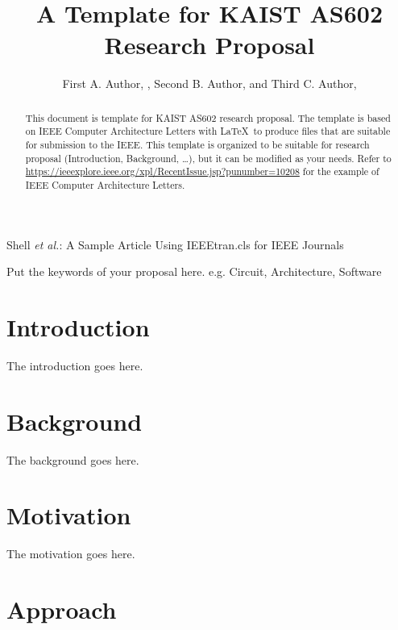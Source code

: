 \documentclass[journal,9pt]{IEEEtran}
\begin{document}
\title{A Template for KAIST AS602 Research Proposal}

\author{First A. Author, , Second B. Author, and Third C. Author, 
}

%
{Shell \MakeLowercase{\textit{et al.}}: A Sample Article Using IEEEtran.cls for IEEE Journals}


\maketitle
\begin{abstract}
  This document is template for KAIST AS602 research proposal.
  The template is based on IEEE Computer Architecture Letters with \LaTeX \ to produce files that are suitable for submission to the IEEE.
  This template is organized to be suitable for research proposal (Introduction, Background, \dots), but it can be modified as your needs.
  Refer to \url{https://ieeexplore.ieee.org/xpl/RecentIssue.jsp?punumber=10208} for the example of IEEE Computer Architecture Letters.
\end{abstract}

\begin{IEEEkeywords}
  Put the keywords of your proposal here. e.g. Circuit, Architecture, Software
\end{IEEEkeywords}

\section{Introduction}

The introduction goes here.

\section{Background}

The background goes here.

\section{Motivation}

The motivation goes here.

\section{Approach}
\end{document}
